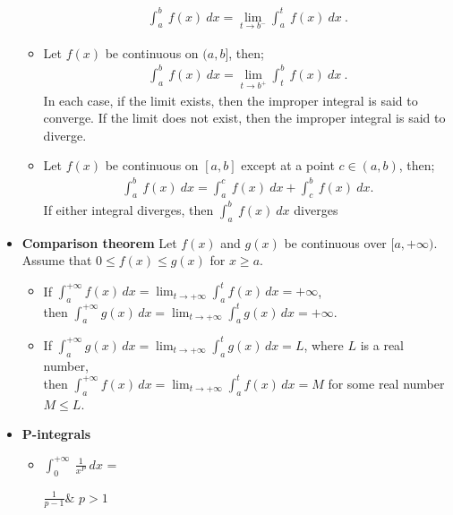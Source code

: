 \documentclass{report}
\begin{document}
\begin{itemize}
\begin{itemize}
\begin{align*}
                    \int_{a}^{b}\ f(x)\ dx = \lim\limits_{t \to b^{-}}{\int_{a}^{t}\ f(x)\ dx}\
                .\end{align*}
            \item Let $f(x)$ be continuous on $(a,b]$, then;
                \begin{align*}
                    \int_{a}^{b}\ f(x)\ dx = \lim\limits_{t \to b^{+}}{\int_{t}^{b}\ f(x)\ dx}\
                .\end{align*}
                In each case, if the limit exists, then the improper integral is said to converge. If the limit does not exist, then the improper integral is said to diverge.
            \item Let $f(x)$ be continuous on $[a,b]$ except at a point $c \in (a,b)$, then;
                \begin{align*}
                    \int_{a}^{b}\ f(x)\ dx = \int_{a}^{c}\ f(x)\ dx  +\int_{c}^{b}\ f(x)\ dx
                .\end{align*}
                If either integral diverges, then $\int_{a}^{b}\ f(x)\ dx $ diverges
        \end{itemize}
        \item \textbf{Comparison theorem}
        Let $f(x)$ and $g(x)$ be continuous over $[a,+\infty)$. Assume that $0 \leq f(x) \leq g(x)$ for $x \geq a$.
        \begin{itemize}
            \item If $\int_a^{+\infty} f(x) \, dx = \lim_{t \to +\infty} \int_a^t f(x) \, dx = +\infty$,  \\
                then $\int_a^{+\infty} g(x) \, dx = \lim_{t \to +\infty} \int_a^t g(x) \, dx = +\infty$.
            \item If $\int_a^{+\infty} g(x) \, dx = \lim_{t \to +\infty} \int_a^t g(x) \, dx = L$, where $L$ is a real number,  \\
                then $\int_a^{+\infty} f(x) \, dx = \lim_{t \to +\infty} \int_a^t f(x) \, dx = M$ for some real number $M \leq L$.
        \end{itemize}
        \pagebreak \bigbreak \noindent 
    \item \textbf{P-integrals}
        \begin{itemize}
            \item $\int_{0}^{+\infty}\ \frac{1}{x^{P}}\ dx $ =  
                    \begin{cases}
                         $\frac{1}{p-1}$& \text{if } $p>1 $ \\

\end{cases}
\end{itemize}
\end{itemize}
\end{document}
